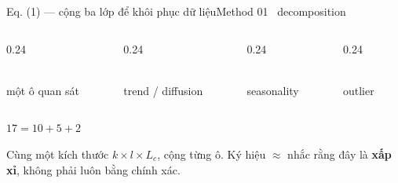\documentclass[aspectratio=169,11pt]{beamer}
\begin{document}
\begin{frame}[shrink=30]{Eq. (1) --- cộng ba lớp để khôi phục dữ liệu}{Method 01 \textperiodcentered\ decomposition}
\vspace{4mm}
\begin{columns}[T,onlytextwidth]
\begin{column}{0.24\textwidth}
\begin{intuition}[Observed]
  \\một ô quan sát
\end{intuition}
\end{column}
\begin{column}{0.24\textwidth}
\begin{mathcard}
  \\trend / diffusion
\end{mathcard}
\end{column}
\begin{column}{0.24\textwidth}
\begin{mathcard}
  \\seasonality
\end{mathcard}
\end{column}
\begin{column}{0.24\textwidth}
\begin{caution}
  \\outlier
\end{caution}
\end{column}
\end{columns}
\vspace{4mm}
\centering
{\Large $17=10+5+2$ }
\vspace{3mm}
\begin{takeaway}
  Cùng một kích thước $k\times l\times L_c$, cộng từng ô. Ký hiệu $\approx$ nhắc rằng đây là \textbf{xấp xỉ}, không phải luôn bằng chính xác.
\end{takeaway}
\vspace{2mm}
\end{frame}
\end{document}

